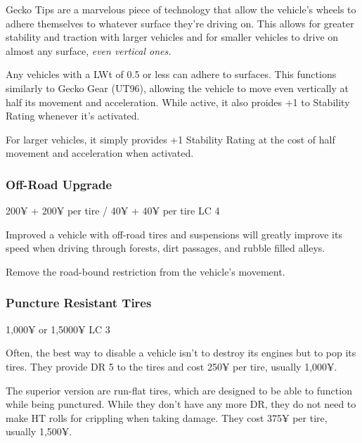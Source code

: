 \begin{multicols*}{2}
	Gecko Tips are a marvelous piece of technology that allow the vehicle's wheels to adhere themselves to whatever surface they're driving on. This allows for greater stability and traction with larger vehicles and for smaller vehicles to drive on almost any surface, \textit{even vertical ones.}
	
	Any vehicles with a LWt of 0.5 or less can adhere to surfaces. This functions similarly to Gecko Gear (UT96), allowing the vehicle to move even vertically at half its movement and acceleration. While active, it also proides +1 to Stability Rating whenever it's activated.
	
	For larger vehicles, it simply provides +1 Stability Rating at the cost of half movement and acceleration when activated.
	

	\subsubsection{Off-Road Upgrade}
	200¥ + 200¥ per tire / 40¥ + 40¥ per tire LC 4
	
	Improved a vehicle with off-road tires and suspensions will greatly improve its speed when driving through forests, dirt passages, and rubble filled alleys.
	
	Remove the road-bound restriction from the vehicle's movement.
	
	\subsubsection{Puncture Resistant Tires}
	1,000¥ or 1,5000¥ LC 3
	
	Often, the best way to disable a vehicle isn't to destroy its engines but to pop its tires. They provide DR 5 to the tires and cost 250¥ per tire, usually 1,000¥.
	
	The superior version are run-flat tires, which are designed to be able to function while being punctured. While they don't have any more DR, they do not need to make HT rolls for crippling when taking damage. They cost 375¥ per tire, usually 1,500¥.	


\end{multicols*}
